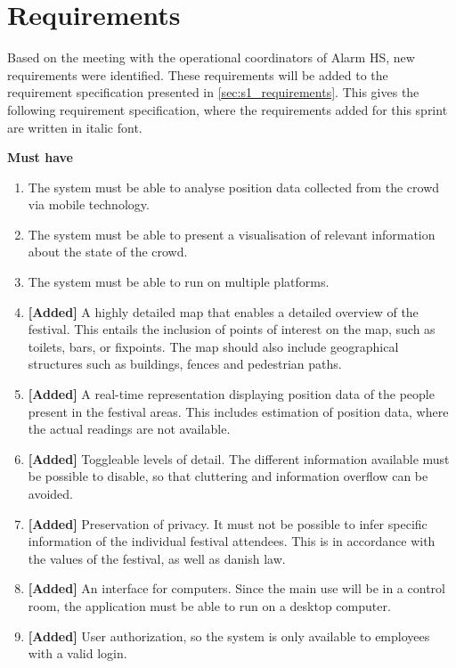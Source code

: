 \section{Requirements} \label{sec:s2_reqs}

Based on the meeting with the operational coordinators of Alarm HS, new requirements were identified. These requirements will be added to the requirement specification presented in \cref{sec:s1_requirements}. This gives the following requirement specification, where the requirements added for this sprint are written in italic font.

\textbf{Must have}
\begin{enumerate}
    \item The system must be able to analyse position data collected from the crowd via mobile technology.
    \item The system must be able to present a visualisation of relevant information about the state of the crowd.
    \item The system must be able to run on multiple platforms.
    \item \textbf{[Added]} A highly detailed map that enables a detailed overview of the festival. This entails the inclusion of points of interest on the map, such as toilets, bars, or fixpoints. The map should also include geographical structures such as buildings, fences and pedestrian paths.
    \item \textbf{[Added]} A real-time representation displaying position data of the people present in the festival areas. This includes estimation of position data, where the actual readings are not available.
    \item \textbf{[Added]} Toggleable levels of detail. The different information available must be possible to disable, so that cluttering and information overflow can be avoided.
    \item \textbf{[Added]} Preservation of privacy. It must not be possible to infer specific information of the individual festival attendees. This is in accordance with the values of the festival, as well as danish law.
    \item \label{itm:desktop_req} \textbf{[Added]} An interface for computers. Since the main use will be in a control room, the application must be able to run on a desktop computer.
    \item \textbf{[Added]} User authorization, so the system is only available to employees with a valid login.
\end{enumerate}

